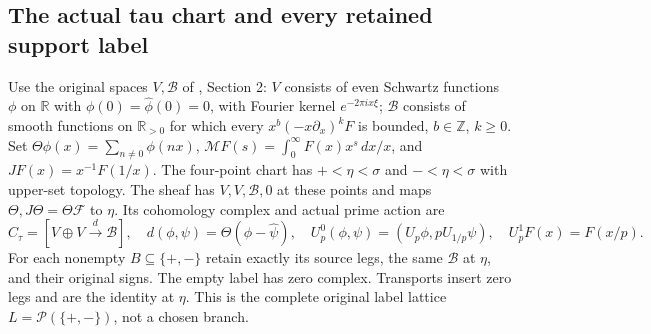 \subsection{The actual tau chart and every retained support label}
Use the original spaces $V,\mathscr B$ of \cite{FJtau}, Section 2:
$V$ consists of even Schwartz functions $\phi$ on $\mathbb R$ with
$\phi(0)=\widehat\phi(0)=0$, with Fourier kernel $e^{-2\pi ix\xi}$;
$\mathscr B$ consists of smooth functions on $\mathbb R_{>0}$ for
which every $x^b(-x\partial_x)^kF$ is bounded, $b\in\mathbb Z$, $k\ge0$.
Set $\Theta\phi(x)=\sum_{n\ne0}\phi(nx)$,
$\mathcal MF(s)=\int_0^\infty F(x)x^s\,dx/x$, and
$J F(x)=x^{-1}F(1/x)$. The four-point chart has
$+<\eta<\sigma$ and $-<\eta<\sigma$ with upper-set topology.
The sheaf has $V,V,\mathscr B,0$ at these points and maps
$\Theta,J\Theta=\Theta\mathcal F$ to $\eta$.
Its cohomology complex and actual prime action are
\[
 C_\tau=[V\oplus V\xrightarrow{d}\mathscr B],\quad
 d(\phi,\psi)=\Theta(\phi-\widehat\psi),\quad
 U_p^0(\phi,\psi)=(U_p\phi,pU_{1/p}\psi),\quad
 U_p^1F(x)=F(x/p).
 \tag{FJ10}\label{fj:fj:tau}
\]
For each nonempty $B\subseteq\{+,-\}$ retain exactly its source
legs, the same $\mathscr B$ at $\eta$, and their original signs.
The empty label has zero complex. Transports insert zero legs and
are the identity at $\eta$. This is the complete original label
lattice $L=\mathcal P(\{+,-\})$, not a chosen branch.


